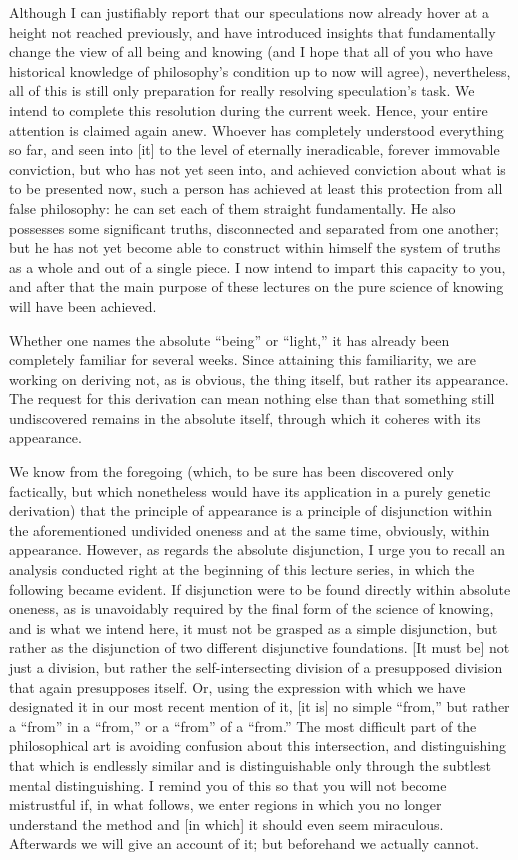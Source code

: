 Although I can justifiably report that
our speculations now already hover at
a height not reached previously,
and have introduced insights
that fundamentally change the view
of all being and knowing
(and I hope that all of you who have historical knowledge
of philosophy's condition up to now will agree),
nevertheless, all of this is still only preparation
for really resolving speculation's task.
We intend to complete this resolution during the current week.
Hence, your entire attention is claimed again anew.
Whoever has completely understood everything so far,
and seen into [it] to the level of
eternally ineradicable, forever immovable conviction,
but who has not yet seen into,
and achieved conviction about
what is to be presented now,
such a person has achieved at least
this protection from all false philosophy:
he can set each of them straight fundamentally.
He also possesses some significant truths,
disconnected and separated from one another;
but he has not yet become able to construct
within himself the system of truths
as a whole and out of a single piece.
I now intend to impart this capacity to you,
and after that the main purpose of these lectures
on the pure science of knowing will have been achieved.

Whether one names the absolute “being” or “light,”
it has already been completely familiar for several weeks.
Since attaining this familiarity, we are working on
deriving not, as is obvious, the thing itself,
but rather its appearance.
The request for this derivation can mean nothing else than
that something still undiscovered remains in the absolute itself,
through which it coheres with its appearance.

We know from the foregoing
(which, to be sure has been discovered only factically,
but which nonetheless would have its application
in a purely genetic derivation)
that the principle of appearance is
a principle of disjunction
within the aforementioned undivided oneness
and at the same time, obviously, within appearance.
However, as regards the absolute disjunction,
I urge you to recall an analysis conducted right at
the beginning of this lecture series,
in which the following became evident.
If disjunction were to be found
directly within absolute oneness,
as is unavoidably required by
the final form of the science of knowing,
and is what we intend here,
it must not be grasped as a simple disjunction,
but rather as the disjunction of
two different disjunctive foundations.
[It must be] not just a division,
but rather the self-intersecting division
of a presupposed division
that again presupposes itself.
Or, using the expression with which we have designated it
in our most recent mention of it,
[it is] no simple “from,”
but rather a “from” in a “from,”
or a “from” of a “from.”
The most difficult part of the philosophical art is
avoiding confusion about this intersection,
and distinguishing that which is endlessly similar
and is distinguishable only through
the subtlest mental distinguishing.
I remind you of this so that you will not become mistrustful
if, in what follows, we enter regions
in which you no longer understand the method
and [in which] it should even seem miraculous.
Afterwards we will give an account of it;
but beforehand we actually cannot.

